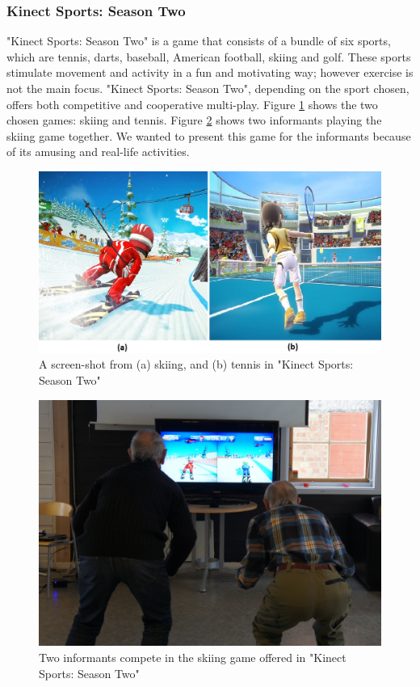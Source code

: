 \subsubsection{Kinect Sports: Season Two}
"Kinect Sports: Season Two" is a game that consists of a bundle of six sports, which are tennis, darts, baseball, American football, skiing and golf. These sports stimulate movement and activity in a fun and motivating way; however exercise is not the main focus. "Kinect Sports: Season Two", depending on the sport chosen, offers both competitive and cooperative multi-play. Figure \ref{fig:sportsgame} shows the two chosen games: skiing and tennis. Figure \ref{fig:elderlyskii} shows two informants playing the skiing game together. We wanted to present this game for the informants because of its amusing and real-life activities. 

\begin{figure} [H]
\centering
\includegraphics[scale=0.4]{skiitennis}
\caption[Kinect Sports: Season Two, Skiing and Tennis]{A screen-shot from (a) skiing, and (b) tennis in "Kinect Sports: Season Two" \cite{sportsgame}}
\label{fig:sportsgame}
\end{figure}

\begin{figure}
\centering
\includegraphics[scale=0.5]{eldreSpiller.jpg}
\caption[Kinect Sports: Season Two, Multi-play]{Two informants compete in the skiing game offered in "Kinect Sports: Season Two"}
\label{fig:elderlyskii}
\end{figure}

